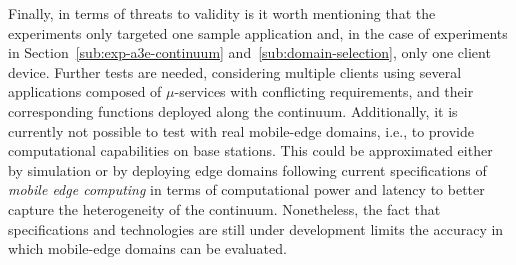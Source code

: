 

Finally, in terms of threats to validity is it worth mentioning that the experiments only targeted one sample application and, in the case of experiments in Section~\ref{sub:exp-a3e-continuum} and~\ref{sub:domain-selection}, only one client device. Further tests are needed, considering multiple clients using several applications composed of $\mu$-services with conflicting requirements, and their corresponding functions deployed along the continuum. Additionally, it is currently not possible to test with real mobile-edge domains, i.e., to provide computational capabilities on base stations. This could be approximated either by simulation or by deploying edge domains following current specifications of \textit{mobile edge computing} in terms of computational power and latency to better capture the heterogeneity of the continuum. Nonetheless, the fact that specifications and technologies are still under development limits the accuracy in which mobile-edge domains can be evaluated.  %



